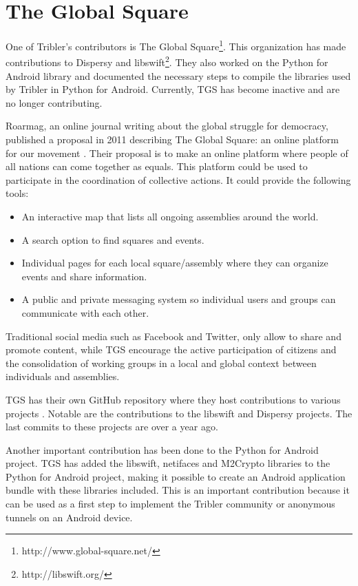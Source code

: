 \section{The Global Square}
	\label{sec:tgs}
	One of Tribler's contributors is The Global Square\footnote{http://www.global-square.net/}. This organization has made contributions to Dispersy and libswift\footnote{http://libswift.org/}. They also worked on the Python for Android library and documented the necessary steps to compile the libraries used by Tribler in Python for Android. Currently, TGS has become inactive and are no longer contributing.
	
	Roarmag, an online journal writing about the global struggle for democracy, published a proposal in 2011 describing The Global Square: an online platform for our movement \cite{theglobalsquare}. Their proposal is to make an online platform where people of all nations can come together as equals. This platform could be used to participate in the coordination of collective actions. It could provide the following tools:
	\begin{itemize}
		\item An interactive map that lists all ongoing assemblies around the world.
		\item A search option to find squares and events.
		\item Individual pages for each local square/assembly where they can organize events and share information.
		\item A public and private messaging system so individual users and groups can communicate with each other.
	\end{itemize}
	Traditional social media such as Facebook and Twitter, only allow to share and promote content, while TGS encourage the active participation of citizens and the consolidation of working groups in a local and global context between individuals and assemblies.
	
	TGS has their own GitHub repository where they host contributions to various projects \cite{theglobalsquaregithub}. Notable are the contributions to the libswift and Dispersy projects. The last commits to these projects are over a year ago.
		
	Another important contribution has been done to the Python for Android project. TGS has added the libswift, netifaces and M2Crypto libraries to the Python for Android project, making it possible to create an Android application bundle with these libraries included. This is an important contribution because it can be used as a first step to implement the Tribler community or anonymous tunnels on an Android device.

